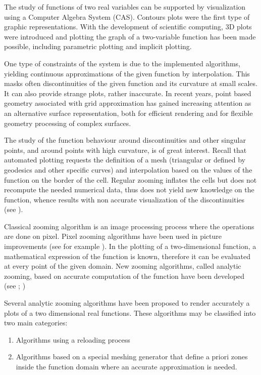 \documentclass[11pt]{article}
\begin{document}
The study of functions of two real variables can be supported by visualization using a Computer Algebra System (CAS). Contours plots were the first type of graphic representations. With the development of scientific computing, 3D plots were introduced and plotting the graph of a two-variable function has been made possible, including parametric plotting and implicit plotting.

One type of constraints of the system is due to the implemented algorithms, yielding continuous approximations of the given function by interpolation. This masks often discontinuities of the given function and its curvature at small scales. It can also provide strange plots, rather inaccurate. In recent years, point based geometry associated with grid approximation has gained increasing attention as an alternative surface representation, both for efficient rendering and for flexible geometry processing of  complex surfaces.

The study of the function behaviour around discontinuities and other singular points, and around points with high curvature, is of great interest. Recall that automated plotting requests the definition of a mesh (triangular or defined by geodesics and other specific curves) and interpolation based on the values of the function on the border of the cell. Regular zooming  inflates the cells but does not recompute the needed numerical data, thus does not yield new knowledge on the function, whence results with non accurate visualization of the discontinuities (see \cite{ZDP}).

Classical zooming algorithm is an image processing process where the operations are done on pixel. Pixel zooming algorithms have been used in picture improvements (see for example \cite{Botsch}). In the plotting of a two-dimensional function, a mathematical expression of the function is known, therefore it can be evaluated at every point of the given domain. New zooming algorithms, called analytic zooming, based on accurate computation of the function have been developed (see \cite{ZeitounDana}; \cite{Zeitoun})

Several analytic zooming   algorithms have been proposed to render accurately a  plots of a  two dimensional real functions. These algorithms may be classified into two main categories:
\begin{enumerate}
\item Algorithms using a reloading process
\item Algorithms based on a special meshing generator that define a priori zones inside the function domain where an accurate approximation is needed.
\end{enumerate}
\end{document}
